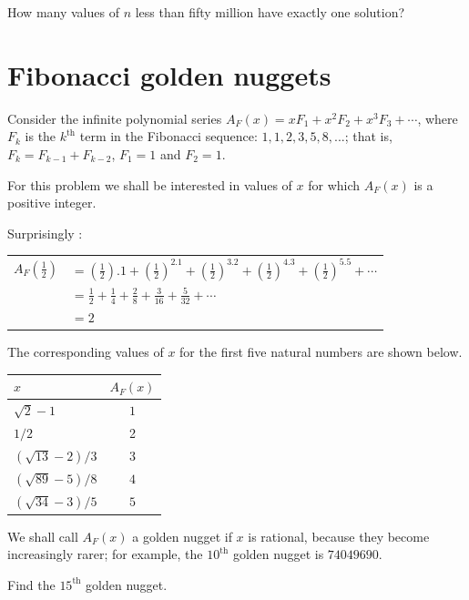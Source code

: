 How many values of $n$ less than fifty million have exactly one solution?



\section{Fibonacci golden nuggets} \label{pb.0137}

Consider the infinite polynomial series $A_F(x) = xF_1 + x^2F_2 + x^3F_3 + \cdots$, where $F_k$ is the $k^{\text{th}}$ term in the Fibonacci sequence: $1, 1, 2, 3, 5, 8, ... $; that is, $F_k = F_{k-1} + F_{k-2}$, $F_1 = 1$ and $F_2 = 1$.
\medskip

For this problem we shall be interested in values of $x$ for which $A_F(x)$ is a positive integer.
\medskip

Surprisingly :

\begin{tabular}{rl}
    $A_F\left(\frac{1}{2}\right)$ & $= \left(\frac{1}{2}\right).1 + \left(\frac{1}{2}\right)^2.1 + \left(\frac{1}{2}\right)^3.2 + \left(\frac{1}{2}\right)^4.3 + \left(\frac{1}{2}\right)^5.5 + \cdots$\\
     & $= \frac{1}{2} + \frac{1}{4} + \frac{2}{8} + \frac{3}{16} + \frac{5}{32} + \cdots$\\
     & $= 2$\\
\end{tabular}
\medskip

The corresponding values of $x$ for the first five natural numbers are shown below.
\begin{center}
    \begin{tabular}{|l|c|}
        \hline
        $x$ & $A_F(x)$\\
        \hline
        $\sqrt{2}-1$ & $1$\\
        \hline
        $1/2$ & 2\\
        \hline
        $(\sqrt{13}-2)/3$ & $3$\\
        \hline
        $(\sqrt{89}-5)/8$ & $4$\\
        \hline
        $(\sqrt{34}-3)/5$ & $5$\\
        \hline
    \end{tabular}
\end{center}


We shall call $A_F(x)$ a golden nugget if $x$ is rational, because they become increasingly rarer; for example, the $10^{\text{th}}$ golden nugget is $74049690$.

Find the $15^{\text{th}}$ golden nugget.



